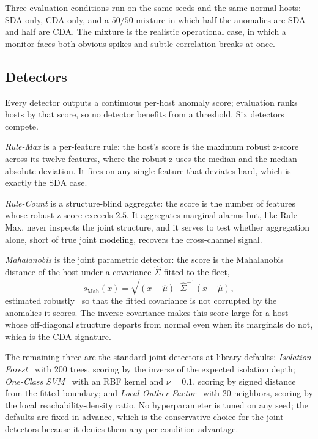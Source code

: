 \documentclass[journal]{IEEEtran}
\begin{document}
Three evaluation conditions run on the same seeds and the same normal hosts: SDA-only, CDA-only, and
a $50/50$ mixture in which half the anomalies are SDA and half are CDA. The mixture is the realistic
operational case, in which a monitor faces both obvious spikes and subtle correlation breaks at once.

\subsection{Detectors}
Every detector outputs a continuous per-host anomaly score; evaluation ranks hosts by that score, so
no detector benefits from a threshold. Six detectors compete.

\emph{Rule-Max} is a per-feature rule: the host's score is the maximum robust z-score across its
twelve features, where the robust z uses the median and the median absolute deviation. It fires on
any single feature that deviates hard, which is exactly the SDA case.

\emph{Rule-Count} is a structure-blind aggregate: the score is the number of features whose robust
z-score exceeds $2.5$. It aggregates marginal alarms but, like Rule-Max, never inspects the joint
structure, and it serves to test whether aggregation alone, short of true joint modeling, recovers
the cross-channel signal.

\emph{Mahalanobis} is the joint parametric detector: the score is the Mahalanobis distance of the
host under a covariance $\hat{\Sigma}$ fitted to the fleet,
\begin{equation}
s_{\mathrm{Mah}}(x) = \sqrt{(x - \hat{\mu})^{\top}\hat{\Sigma}^{-1}(x - \hat{\mu})},
\end{equation}
estimated robustly~\cite{rousseeuw1999mcd} so that the fitted covariance is not corrupted by the
anomalies it scores. The inverse covariance makes this score large for a host whose off-diagonal
structure departs from normal even when its marginals do not, which is the CDA signature.

The remaining three are the standard joint detectors at library defaults: \emph{Isolation
Forest}~\cite{liu2008isolation} with 200 trees, scoring by the inverse of the expected isolation
depth; \emph{One-Class SVM}~\cite{scholkopf2001oneclass} with an RBF kernel and $\nu = 0.1$, scoring
by signed distance from the fitted boundary; and \emph{Local Outlier
Factor}~\cite{breunig2000lof} with 20 neighbors, scoring by the local reachability-density ratio. No
hyperparameter is tuned on any seed; the defaults are fixed in advance, which is the conservative
choice for the joint detectors because it denies them any per-condition advantage.
\end{document}
